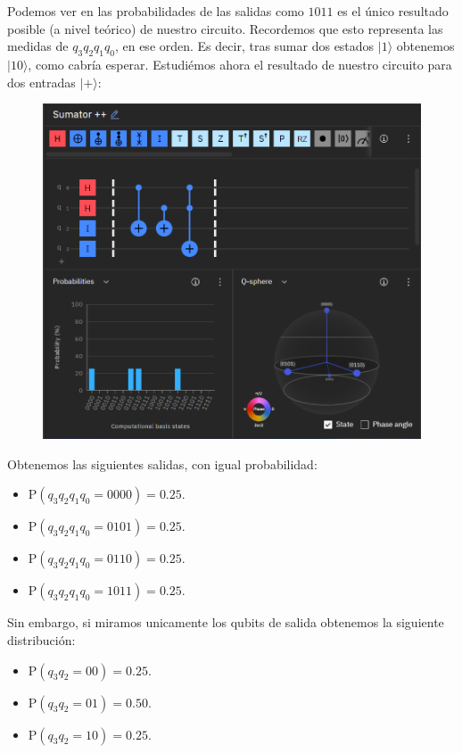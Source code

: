 \documentclass[11pt]{article}
\newcommand{\ra}{\rangle}
\theoremstyle{plain}
\begin{document}
Podemos ver en las probabilidades de las salidas como $1011$ es el único resultado posible (a nivel teórico) de nuestro circuito. Recordemos que esto representa las medidas de $q_3 q_2 q_1 q_0$, en ese orden. Es decir, tras sumar dos estados $|1\ra$ obtenemos $|10\ra$, como cabría esperar. Estudiémos ahora el resultado de nuestro circuito para dos entradas $|+\ra$:

\begin{figure}[H]
	\centering
	\includegraphics[scale=0.7]{figures/sumator_++.png}
\end{figure}

Obtenemos las siguientes salidas, con igual probabilidad:

\begin{itemize}
	\item P$(q_3q_2q_1q_0 = 0000) = 0.25$.
	\item P$(q_3q_2q_1q_0 = 0101) = 0.25$.
	\item P$(q_3q_2q_1q_0 = 0110) = 0.25$.
	\item P$(q_3q_2q_1q_0 = 1011) = 0.25$.
\end{itemize}

Sin embargo, si miramos unicamente los qubits de salida obtenemos la siguiente distribución:

\begin{itemize}
	\item P$(q_3q_2 = 00) = 0.25$.
	\item P$(q_3q_2 = 01) = 0.50$.
	\item P$(q_3q_2 = 10) = 0.25$.
\end{itemize}
\end{document}

